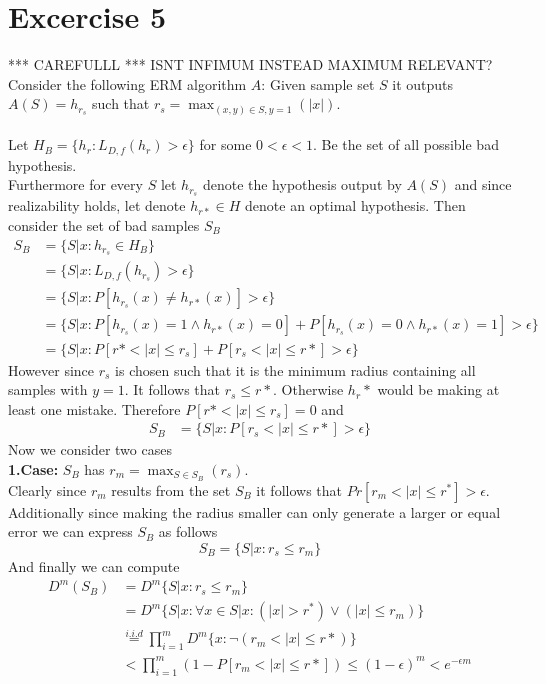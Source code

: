 \documentclass[12pt]{article}
\begin{document}
\section*{Excercise 5}
*** CAREFULLL *** ISNT INFIMUM INSTEAD MAXIMUM RELEVANT?
Consider the following ERM algorithm $A$: Given sample set $S$ it outputs $A(S)=h_{r_s}$ such that $r_s = \max_{(x,y) \in S, y=1}(|x|)$. \\\\
Let $H_B=\{h_r: L_{D,f}(h_r) > \epsilon\}$ for some $0 < \epsilon < 1$. Be the set of all possible bad hypothesis. \\
Furthermore for every $S$ let $h_{r_s}$ denote the hypothesis output by $A(S)$ and since realizability holds, let denote $h_{r*} \in H$ denote an optimal hypothesis. Then consider the set of bad samples $S_B$
\begin{align*}
	S_B &= \{S|x : h_{r_s} \in H_B\} \\
	&= \{S|x: L_{D,f}(h_{r_s}) > \epsilon\} \\
	&= \{S|x: P[h_{r_s}(x) \neq h_{r*}(x)] > \epsilon\} \\
	&= \{S|x: P[h_{r_s}(x) = 1 \land h_{r*}(x) = 0] +  P[h_{r_s}(x) = 0 \land h_{r*}(x) = 1] > \epsilon \}\\
	&= \{S|x: P[r* < |x| \leq r_s] + P[r_s < |x| \leq r*] > \epsilon \}
\end{align*}
However since $r_s$ is chosen such that it is the minimum radius containing all samples with $y=1$. It follows that $r_s \leq r*$. Otherwise $h_r*$ would be making at least one mistake. Therefore $P[r* < |x| \leq r_s] = 0$ and
\begin{align*}
	S_B &= \{S|x:  P[r_s < |x| \leq r*] > \epsilon \}
\end{align*}
Now we consider two cases\\
\textbf{1.Case: }$S_B$ has $r_m = \max_{S \in S_B} (r_s)$.\\
Clearly since $r_m$ results from the set $S_B$ it follows that $Pr[r_m < |x| \leq r^*] > \epsilon$. Additionally since making the radius smaller can only generate a larger or equal error we can express $S_B$ as follows
\begin{equation*}
	S_B = \{S|x: r_s \leq r_m\}
\end{equation*}
And finally we can compute
\begin{align*}
	D^m(S_B) &= D^m \{S|x : r_s \leq r_m\}\\
	&= D^m \{S|x : \forall x \in S|x: (|x| > r^*) \lor (|x| \leq r_m)\} \\
	&\overset{i.i.d}{=} \prod_{i=1}^{m} D^m\{x: \neg (r_m < |x|\leq r*)\} \\
	&< \prod_{i=1}^{m} (1- P[r_m < |x| \leq r*]) \leq (1- \epsilon)^m < e^{-\epsilon m}
\end{align*}
\end{document}
